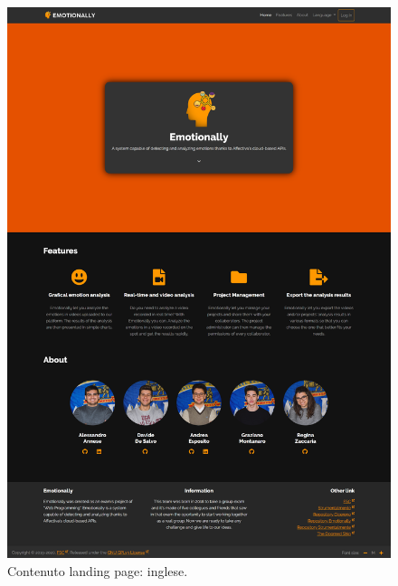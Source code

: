 \begin{figure}[H]
	\centering
	\caption{Contenuto landing page: inglese.}
	\label{fig:contenuto-landing:inglese}
	\includegraphics[width=\textwidth]{images/prototipo-editoriale/eng}
\end{figure}
